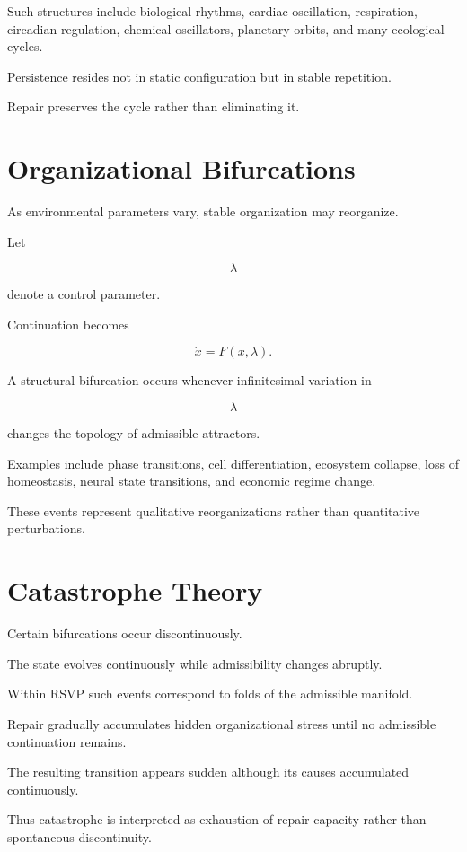 \documentclass[11pt,oneside]{book}
\numberwithin{equation}{chapter}
\theoremstyle{definition}
\theoremstyle{plain}
\begin{document}
Such structures include biological rhythms, cardiac oscillation,
respiration, circadian regulation, chemical oscillators, planetary orbits,
and many ecological cycles.

Persistence resides not in static configuration but in stable repetition.

Repair preserves the cycle rather than eliminating it.

\section{Organizational Bifurcations}

As environmental parameters vary, stable organization may reorganize.

Let

\[
\lambda
\]

denote a control parameter.

Continuation becomes

\[
\dot{x}
=
F(x,\lambda).
\]

A structural bifurcation occurs whenever infinitesimal variation in

\[
\lambda
\]

changes the topology of admissible attractors.

Examples include phase transitions, cell differentiation, ecosystem
collapse, loss of homeostasis, neural state transitions, and economic regime
change.

These events represent qualitative reorganizations rather than quantitative
perturbations.

\section{Catastrophe Theory}

Certain bifurcations occur discontinuously.

The state evolves continuously while admissibility changes abruptly.

Within RSVP such events correspond to folds of the admissible manifold.

Repair gradually accumulates hidden organizational stress until no
admissible continuation remains.

The resulting transition appears sudden although its causes accumulated
continuously.

Thus catastrophe is interpreted as exhaustion of repair capacity rather than
spontaneous discontinuity.
\end{document}
